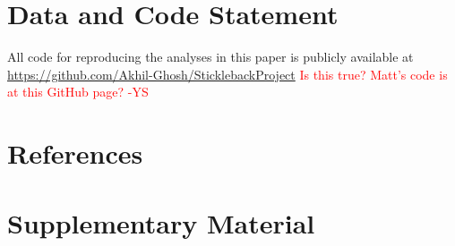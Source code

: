 \documentclass[
  12pt,
]{article}
\begin{document}
\hypertarget{sec:datastatement}{%
\section{Data and Code Statement}\label{sec:datastatement}}

All code for reproducing the analyses in this paper is publicly
available at \url{https://github.com/Akhil-Ghosh/SticklebackProject}
\textcolor{red}{Is this true? Matt's code is at this GitHub page? -YS}

\hypertarget{sec:references}{%
\section{References}\label{sec:references}}

\hypertarget{sec:supplementary}{%
\section{Supplementary Material}\label{sec:supplementary}}
\end{document}
